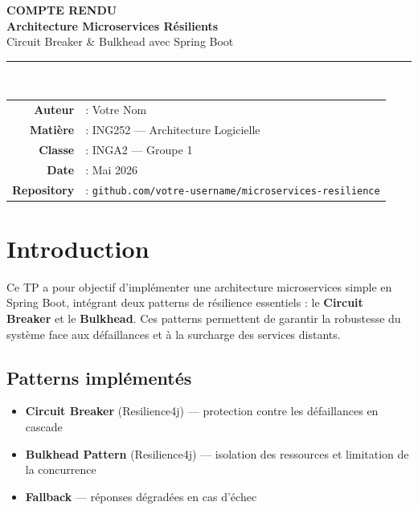 \documentclass[11pt,a4paper]{article}
\begin{document}
\begin{center}
    \vspace*{1cm}
    {\color{primaryblue}\Huge\bfseries COMPTE RENDU}\\[0.5em]
    {\color{primaryblue}\Large\bfseries Architecture Microservices Résilients}\\[0.5em]
    {\large Circuit Breaker \& Bulkhead avec Spring Boot}\\[1em]
    \color{primaryblue}\rule{0.7\linewidth}{1.2pt}\\
\end{center}

\vspace{0.5cm}

\begin{center}
\begin{tabular}{rl}
    \textbf{Auteur} & : Votre Nom \\
    \textbf{Matière} & : ING252 --- Architecture Logicielle \\
    \textbf{Classe} & : INGA2 --- Groupe 1 \\
    \textbf{Date} & : Mai 2026 \\
    \textbf{Repository} & : \texttt{github.com/votre-username/microservices-resilience} \\
\end{tabular}
\end{center}

\vspace{1cm}

\section{Introduction}

Ce TP a pour objectif d'implémenter une architecture microservices simple en Spring Boot, intégrant deux patterns de résilience essentiels : le \textbf{Circuit Breaker} et le \textbf{Bulkhead}. Ces patterns permettent de garantir la robustesse du système face aux défaillances et à la surcharge des services distants.

\subsection*{Patterns implémentés}
\begin{itemize}[leftmargin=*, label=\textcolor{primaryblue}{$\blacktriangleright$}]
    \item \textbf{Circuit Breaker} (Resilience4j) --- protection contre les défaillances en cascade
    \item \textbf{Bulkhead Pattern} (Resilience4j) --- isolation des ressources et limitation de la concurrence
    \item \textbf{Fallback} --- réponses dégradées en cas d'échec
\end{itemize}
\end{document}
